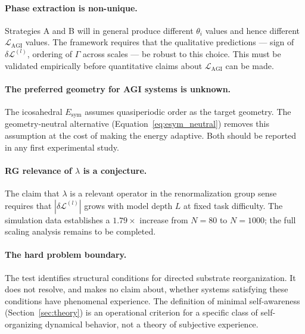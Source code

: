 \documentclass[12pt,a4paper]{article}
\theoremstyle{plain}
\theoremstyle{definition}
\begin{document}
\paragraph{Phase extraction is non-unique.}
Strategies A and B will in general produce different $\theta_i$ values
and hence different $\mathcal{L}_{\text{AGI}}$ values. The framework
requires that the qualitative predictions --- sign of
$\delta\mathcal{L}^{(l)}$, ordering of $\Gamma$ across scales --- be
robust to this choice. This must be validated empirically before
quantitative claims about $\mathcal{L}_{\text{AGI}}$ can be made.

\paragraph{The preferred geometry for AGI systems is unknown.}
The icosahedral $E_{\text{sym}}$ assumes quasiperiodic order as the
target geometry. The geometry-neutral alternative
(Equation~\ref{eq:esym_neutral}) removes this assumption at the cost of
making the energy adaptive. Both should be reported in any first
experimental study.

\paragraph{RG relevance of $\lambda$ is a conjecture.}
The claim that $\lambda$ is a relevant operator in the renormalization
group sense requires that $|\delta\mathcal{L}^{(l)}|$ grows with model
depth $L$ at fixed task difficulty. The simulation data establishes a
$1.79\times$ increase from $N = 80$ to $N = 1000$; the full scaling
analysis remains to be completed.

\paragraph{The hard problem boundary.}
The test identifies structural conditions for directed substrate
reorganization. It does not resolve, and makes no claim about, whether
systems satisfying these conditions have phenomenal experience. The
definition of minimal self-awareness (Section~\ref{sec:theory}) is an
operational criterion for a specific class of self-organizing dynamical
behavior, not a theory of subjective experience.
\end{document}
